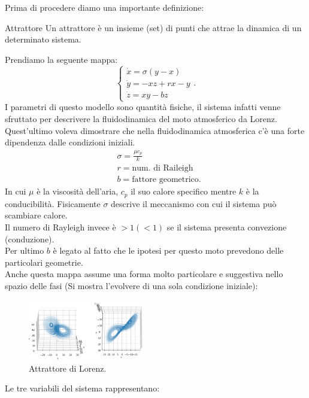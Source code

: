 \noindent
Prima di procedere diamo una importante definizione:
\begin{redbox}{Attrattore}
    Un attrattore è un insieme (set) di punti che attrae la dinamica di un determinato sistema.
\end{redbox}
\noindent
\begin{exmp}
    Prendiamo la seguente mappa:
    \[
        \begin{cases}
	    \dot{x} = \sigma (y-x)\\
	    \dot{y} = -xz + rx - y \\
	    \dot{z} = xy - bz
        \end{cases}
    .\] 
    I parametri di questo modello sono quantità fisiche, il sistema infatti venne sfruttato per descrivere la fluidodinamica del moto atmosferico da Lorenz. Quest'ultimo voleva dimostrare che nella fluidodinamica atmosferica c'è una forte dipendenza dalle condizioni iniziali.
    \[\begin{aligned}
	&\sigma = \frac{\mu c_p}{k} \\
	&r = \text{num. di Raileigh} \\
	& b = \text{fattore geometrico}
    .\end{aligned}\]
    In cui $\mu$ è la viscosità dell'aria, $c_p$ il suo calore specifico mentre $k$ è la conducibilità. 
    Fisicamente $\sigma$ descrive il meccanismo con cui il sistema può scambiare calore.\\
    Il numero di Rayleigh invece è $>1 (<1)$ se il sistema presenta convezione (conduzione).\\ 
    Per ultimo $b$ è legato al fatto che le ipotesi per questo moto prevedono delle particolari geometrie. \\
    Anche questa mappa assume una forma molto particolare e suggestiva nello spazio delle fasi (Si mostra l'evolvere di una sola condizione iniziale):
    \begin{figure}[H]
        \centering
	\includegraphics[width=0.45\textwidth]{figures/22_lorenz.png}
        \caption{\scriptsize Attrattore di Lorenz.}
        \label{fig:figures-22_lorenz-png}
    \end{figure}
    Le tre variabili del sistema rappresentano:

\end{exmp}
